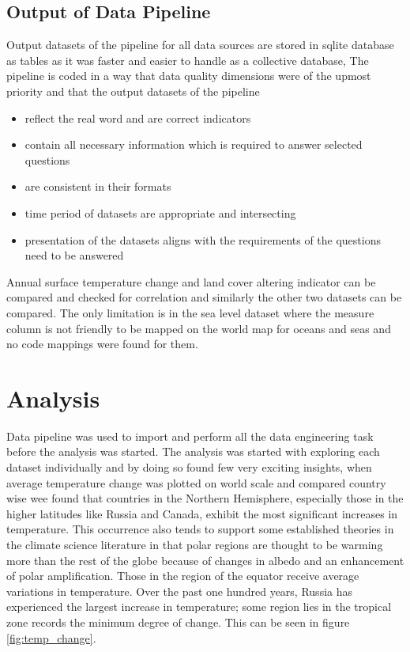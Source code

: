 \documentclass[a4paper,11pt]{article}
\begin{document}
\subsection{Output of Data Pipeline}
Output datasets of the pipeline for all data sources are stored in sqlite database as tables as it was faster and easier to handle as a collective database, The pipeline is coded in a way that data quality dimensions were of the upmost priority and that the output datasets of the pipeline
\begin{itemize}
    \item reflect the real word and are correct indicators
    \item contain all necessary information which is required to answer selected questions
    \item are consistent in their formats
    \item time period of datasets are appropriate and intersecting
    \item presentation of the datasets aligns with the requirements of the questions need to be answered
\end{itemize}

Annual surface temperature change and land cover altering indicator can be compared and checked for correlation and similarly the other two datasets can be compared. The only limitation is in the sea level dataset where the measure column is not friendly to be mapped on the world map for oceans and seas and no code mappings were found for them.

\section{Analysis}

Data pipeline was used to import and perform all the data engineering task before the analysis was started. The analysis was started with exploring each dataset individually and by doing so found few very exciting insights, when average temperature change was plotted on world scale and compared country wise wee found that countries in the Northern Hemisphere, especially those in the higher latitudes like Russia and Canada, exhibit the most significant increases in temperature. This occurrence also tends to support some established theories in the climate science literature in that polar regions are thought to be warming more than the rest of the globe because of changes in albedo and an enhancement of polar amplification. Those in the region of the equator receive average variations in temperature. Over the past one hundred years, Russia has experienced the largest increase in temperature; some region lies in the tropical zone records the minimum degree of change. This can be seen in figure \ref{fig:temp_change}.
\end{document}
